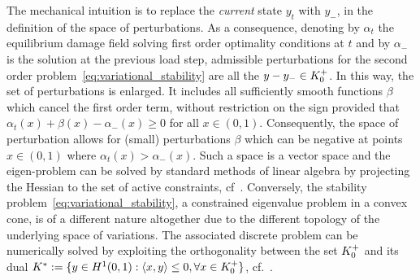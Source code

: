 The mechanical intuition is to replace the \emph{current} state $y_t$ with $y_-$, in the definition of the space of perturbations.
As a consequence, denoting by $\alpha_t$ the equilibrium damage field solving first order optimality conditions at $t$ and by $\alpha_-$ is the solution at the previous load step, admissible perturbations for the second order problem~\eqref{eq:variational_stability} are all the $y-y_-\in K^+_{0}$. In this way, the set of perturbations is enlarged. It includes all sufficiently smooth functions $\beta$ which cancel the first order term, without restriction on the sign provided that $\alpha_t(x) + \beta(x) - \alpha_-(x)\geq 0$ for all $x\in (0, 1)$.
% 
Consequently, the space of perturbation allows for (small) perturbations $\beta$ which can be negative at points $x\in(0,1)$ where $\alpha_t(x)>\alpha_-(x)$.
Such a space is a vector space and the eigen-problem can be solved by standard methods of linear algebra by projecting the Hessian to the set of active constraints, cf~\cite{Nocedal1999-zr}.
Conversely, the stability problem~\eqref{eq:variational_stability}, a constrained eigenvalue problem in a convex cone, is of a different nature altogether due to the different topology of the underlying space of variations.
The associated discrete problem can be numerically solved by exploiting the orthogonality between the set $K^+_{0}$ and its dual $K^*:=\{y \in H^1(0,1): \langle x,y \rangle \leq 0, \forall x \in K^+_{0}\}$, cf.~\cite{Moreau1962-fz,Pinto_da_Costa2010-qv}.



